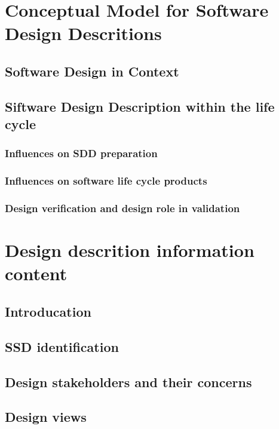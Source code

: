\documentclass{scrreprt}
\begin{document}
\chapter{Conceptual Model for Software Design Descritions}

\section{Software Design in Context}

\section{Siftware Design Description within the life cycle}

\subsection{Influences on SDD preparation}

\subsection{Influences on software life cycle products}

\subsection{Design verification and design role in validation}

\chapter{Design descrition information content}

\section{Introducation}

\section{SSD identification}

\section{Design stakeholders and their concerns}

\section{Design views}
\end{document}
